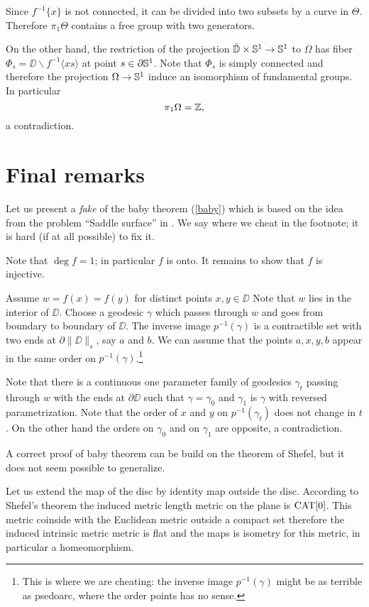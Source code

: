 \documentclass{article}
\begin{document}
Since $f^{-1}\{x\}$ is not connected, it can be divided into two subsets by a curve in $\Theta$.
Therefore $\pi_1\Theta$ contains a free group with two generators.

On the other hand, the restriction of the projection $\check{\mathbb{D}}\times\mathbb{S}^1\to \mathbb{S}^1$ to $\Omega$ has fiber 
$\Phi_s=\DD\backslash f^{-1}\langle xs\rangle$ at point $s\in\partial \mathbb{S}^1$.
Note that $\Phi_s$ is simply connected and therefore the projection $\Omega\to \mathbb{S}^1$ induce an isomorphism of fundamental groups.
In particular 
\[\pi_1\Omega=\mathbb{Z},\]
a contradiction.
\qeds

\section{Final remarks}

Let us present a \emph{fake} of the baby theorem (\ref{baby}) which is based on the idea from the problem ``Saddle surface'' in \cite{petrunin-orthodox}.
We say where we cheat in the footnote; 
it is hard (if at all possible) to fix it.

Note that  $\deg f=1$;
in particular $f$ is onto.
It remains to show that $f$ is injective.

Assume  $w=f(x)=f(y)$ for distinct points $x,y\in\DD$
Note that  $w$ lies in the interior of $\DD$.
Choose a geodesic $\gamma$ which passes through $w$ and goes 
from boundary to boundary of $\DD$.
The inverse image $p^{-1}(\gamma)$ is a contractible set with two ends at $\partial\|\DD\|_s$, say $a$ and $b$.
We can assume that the points $a,x,y,b$ appear in the same order on $p^{-1}(\gamma)$.\footnote{This is where we are cheating: the inverse image $p^{-1}(\gamma)$ might be as terrible as psedoarc, where the order points has no sense.}

Note that there is a continuous one parameter family of geodesics $\gamma_t$ passing through $w$ with the ends at $\partial \DD$
such that $\gamma=\gamma_0$ and $\gamma_1$ is $\gamma$ with reversed parametrization.
Note that the order of $x$ and $y$ on $p^{-1}(\gamma_t)$ does not change in $t$.
On the other hand the orders on $\gamma_0$ and on $\gamma_1$ are opposite, a contradiction.\qeds

A correct proof of baby theorem can be build on the theorem of Shefel, but it does not seem possible to generalize.

Let us extend the map of the disc by identity map outside the disc. 
According to Shefel's theorem the induced metric length metric on the plane is $\mathop{\rm CAT}\nolimits[0]$.
This metric coinside with the Euclidean metric outside a compact set therefore the induced intrinsic metric metric is flat and the maps is isometry for this metric, in particular a homeomorphism.\qeds
\end{document}
